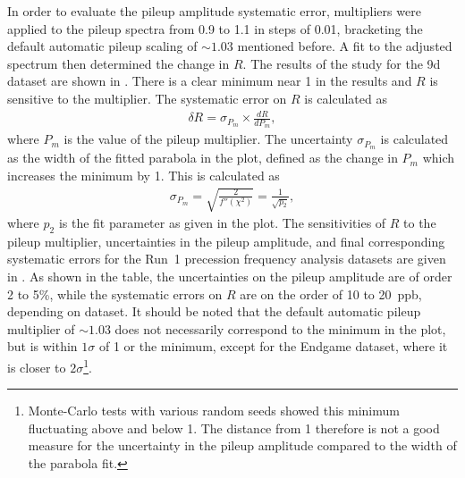 In order to evaluate the pileup amplitude systematic error, multipliers were applied to the pileup spectra from 0.9 to 1.1 in steps of 0.01, bracketing the default automatic pileup scaling of $\sim1.03$ mentioned before. A fit to the adjusted spectrum then determined the change in $R$. The results of the study for the 9d dataset are shown in . There is a clear minimum near 1 in the \chisq results and $R$ is sensitive to the multiplier. The systematic error on $R$ is calculated as 
    \begin{align}
        \delta R = \sigma_{P_{m}} \times \frac{dR}{dP_{m}},
    \end{align}
where $P_{m}$ is the value of the pileup multiplier. The uncertainty $\sigma_{P_{m}}$ is calculated as the width of the fitted parabola in the \chisq plot, defined as the change in $P_{m}$ which increases the minimum \chisq by 1. This is calculated as 
    \begin{align}
        \sigma_{P_{m}} = \sqrt{\frac{2}{f''(\chi^{2})}} = \frac{1}{\sqrt{p_{2}}},
    \end{align}
where $p_{2}$ is the fit parameter as given in the \chisq plot. The sensitivities of $R$ to the pileup multiplier, uncertainties in the pileup amplitude, and final corresponding systematic errors for the Run~1 precession frequency analysis datasets are given in . As shown in the table, the uncertainties on the pileup amplitude are of order 2 to 5\%, while the systematic errors on $R$ are on the order of \SI{10}{} to \SI{20}{ppb}, depending on dataset.  It should be noted that the default automatic pileup multiplier of $\sim1.03$ does not necessarily correspond to the minimum in the \chisq plot, but is within $1\sigma$ of 1 or the minimum, except for the Endgame dataset, where it is closer to $2\sigma$\footnote{Monte-Carlo tests with various random seeds showed this minimum fluctuating above and below 1. The distance from 1 therefore is not a good measure for the uncertainty in the pileup amplitude compared to the width of the \chisq parabola fit.}.


